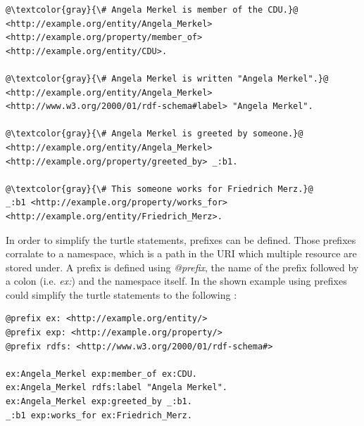 \documentclass[a4paper,oneside,bibliography=totoc]{scrbook}
\begin{document}
\begin{lstlisting}[language=Turtle, caption=Example of a Knowledge Graph in Turtle Format, label=lst:turtle_example, escapechar=@]
@\textcolor{gray}{\# Angela Merkel is member of the CDU.}@
<http://example.org/entity/Angela_Merkel> <http://example.org/property/member_of> <http://example.org/entity/CDU>.

@\textcolor{gray}{\# Angela Merkel is written "Angela Merkel".}@
<http://example.org/entity/Angela_Merkel> <http://www.w3.org/2000/01/rdf-schema#label> "Angela Merkel".

@\textcolor{gray}{\# Angela Merkel is greeted by someone.}@
<http://example.org/entity/Angela_Merkel> <http://example.org/property/greeted_by> _:b1.

@\textcolor{gray}{\# This someone works for Friedrich Merz.}@
_:b1 <http://example.org/property/works_for> <http://example.org/entity/Friedrich_Merz>.
\end{lstlisting}

In order to simplify the turtle statements, prefixes can be defined. Those prefixes corralate to a namespace, which is a path in the \ac{URI} which multiple resource are stored under. A prefix is defined using \textit{@prefix}, the name of the prefix followed by a colon (i.e. \textit{ex:}) and the namespace itself. In the shown example using prefixes could simplify the turtle statements to the following \cite{Tomaszuk2020}:

\begin{lstlisting}[language=Turtle, caption=Example of a Knowledge Graph in Turtle Format, label=lst:turtle_example]
@prefix ex: <http://example.org/entity/>
@prefix exp: <http://example.org/property/>
@prefix rdfs: <http://www.w3.org/2000/01/rdf-schema#>

ex:Angela_Merkel exp:member_of ex:CDU.
ex:Angela_Merkel rdfs:label "Angela Merkel".
ex:Angela_Merkel exp:greeted_by _:b1.
_:b1 exp:works_for ex:Friedrich_Merz.
\end{lstlisting}
\end{document}
